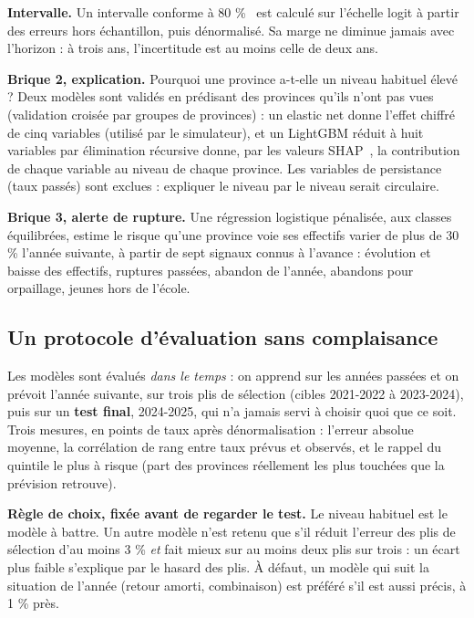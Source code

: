 \documentclass{article}
\begin{document}
\textbf{Intervalle.} Un intervalle conforme à 80 \%~\cite{vovk,angelopoulos} est calculé sur l'échelle logit à partir des erreurs hors échantillon, puis dénormalisé. Sa marge ne diminue jamais avec l'horizon : à trois ans, l'incertitude est au moins celle de deux ans.

\textbf{Brique 2, explication.} Pourquoi une province a-t-elle un niveau habituel élevé ? Deux modèles sont validés en prédisant des provinces qu'ils n'ont pas vues (validation croisée par groupes de provinces) : un elastic net donne l'effet chiffré de cinq variables (utilisé par le simulateur), et un LightGBM réduit à huit variables par élimination récursive donne, par les valeurs SHAP~\cite{shap}, la contribution de chaque variable au niveau de chaque province. Les variables de persistance (taux passés) sont exclues : expliquer le niveau par le niveau serait circulaire.

\textbf{Brique 3, alerte de rupture.} Une régression logistique pénalisée, aux classes équilibrées, estime le risque qu'une province voie ses effectifs varier de plus de 30 \% l'année suivante, à partir de sept signaux connus à l'avance : évolution et baisse des effectifs, ruptures passées, abandon de l'année, abandons pour orpaillage, jeunes hors de l'école.

\subsection{Un protocole d'évaluation sans complaisance}

Les modèles sont évalués \emph{dans le temps} : on apprend sur les années passées et on prévoit l'année suivante, sur trois plis de sélection (cibles 2021-2022 à 2023-2024), puis sur un \textbf{test final}, 2024-2025, qui n'a jamais servi à choisir quoi que ce soit. Trois mesures, en points de taux après dénormalisation : l'erreur absolue moyenne, la corrélation de rang entre taux prévus et observés, et le rappel du quintile le plus à risque (part des provinces réellement les plus touchées que la prévision retrouve).

\textbf{Règle de choix, fixée avant de regarder le test.} Le niveau habituel est le modèle à battre. Un autre modèle n'est retenu que s'il réduit l'erreur des plis de sélection d'au moins 3 \% \emph{et} fait mieux sur au moins deux plis sur trois : un écart plus faible s'explique par le hasard des plis. À défaut, un modèle qui suit la situation de l'année (retour amorti, combinaison) est préféré s'il est aussi précis, à 1 \% près.
\end{document}
